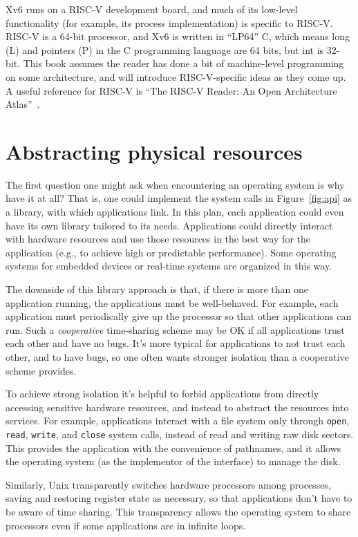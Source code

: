 Xv6 runs on a RISC-V development board, and much of its low-level
functionality (for example, its process implementation) is specific to
RISC-V.  RISC-V is a 64-bit processor, and Xv6 is written in ``LP64'' C,
which means long (L) and pointers (P) in the C programming language
are 64 bits, but int is 32-bit.  This book assumes the reader has done
a bit of machine-level programming on some architecture, and will
introduce RISC-V-specific ideas as they come up.  A useful reference
for RISC-V is ``The RISC-V Reader: An Open Architecture Atlas''~\cite{riscv}.

\section{Abstracting physical resources}

The first question one might ask when encountering an operating system is why
have it at all?  That is, one could implement the system calls in
Figure~\ref{fig:api}
as a library, with which applications link.  In this plan,
each application could even have its own library tailored to its needs.
Applications could directly interact with hardware resources
and use those resources in the best way for the application (e.g., to achieve
high or predictable performance).  Some operating systems for
embedded devices or real-time systems are organized in this way.

The downside of this library approach is that, if there is more than one
application running, the applications must be well-behaved.
For example, each application must periodically give up the
processor so that other applications can run.
Such a 
\textit{cooperative} 
time-sharing scheme may be OK if all applications trust each
other and have no bugs. It's more typical for applications
to not trust each other, and to have bugs, so one often wants
stronger isolation than a cooperative scheme provides.

To achieve strong isolation it's helpful to forbid applications from
directly accessing sensitive hardware resources, and instead to abstract the
resources into services.  For example, applications interact with a file system
only through
\lstinline{open},
\lstinline{read},
\lstinline{write}, 
and
\lstinline{close}
system calls,
instead of read and writing raw disk sectors. 
This provides the application with the convenience of pathnames, and it allows
the operating system (as the implementor of the interface) to manage the disk. 

Similarly, Unix transparently switches hardware processors among processes,
saving and restoring register state as necessary,
so that applications don't have to be
aware of time sharing.  This transparency allows the operating system to share
processors even if some applications are in infinite loops.


